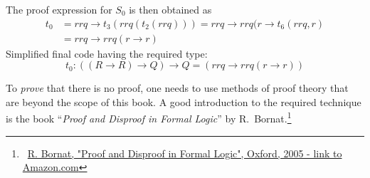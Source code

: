 The proof expression for $S_{0}$ is then obtained as
\begin{align*}
t_{0} & =rrq\rightarrow t_{3}\left(rrq\left(t_{2}\left(rrq\right)\right)\right)=rrq\rightarrow rrq(r\rightarrow t_{6}\left(rrq,r\right)\\
 & =rrq\rightarrow rrq\left(r\rightarrow r\right)
\end{align*}
Simplified final code having the required type: 
\[
t_{0}:\left(\left(R\rightarrow R\right)\rightarrow Q\right)\rightarrow Q=\left(rrq\rightarrow rrq\left(r\rightarrow r\right)\right)
\]

To \emph{prove} that there is no proof, one needs to use methods of
proof theory that are beyond the scope of this book. A good introduction
to the required technique is the book \textsf{``}\emph{Proof and Disproof
in Formal Logic}\textsf{''} by R.~Bornat.\footnote{~\href{https://www.amazon.com/Proof-Disproof-Formal-Logic-Introduction/dp/0198530277}{R. Bornat, "Proof and Disproof in Formal Logic", Oxford, 2005 - link to Amazon.com}} 

